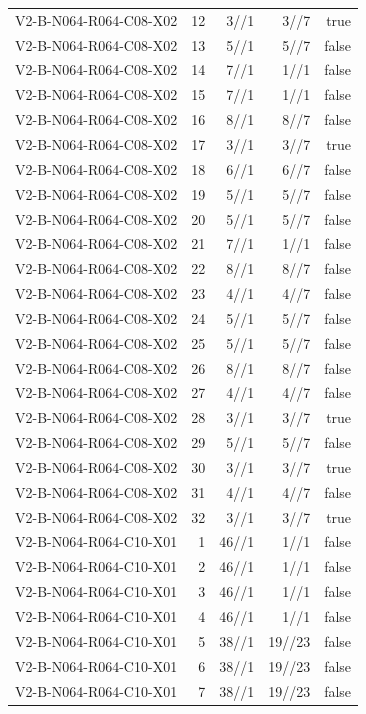 {\begin{longtable}{lrrrr}
V2-B-N064-R064-C08-X02 & 12 & 3//1 & 3//7 & true \\
V2-B-N064-R064-C08-X02 & 13 & 5//1 & 5//7 & false \\
V2-B-N064-R064-C08-X02 & 14 & 7//1 & 1//1 & false \\
V2-B-N064-R064-C08-X02 & 15 & 7//1 & 1//1 & false \\
V2-B-N064-R064-C08-X02 & 16 & 8//1 & 8//7 & false \\
V2-B-N064-R064-C08-X02 & 17 & 3//1 & 3//7 & true \\
V2-B-N064-R064-C08-X02 & 18 & 6//1 & 6//7 & false \\
V2-B-N064-R064-C08-X02 & 19 & 5//1 & 5//7 & false \\
V2-B-N064-R064-C08-X02 & 20 & 5//1 & 5//7 & false \\
V2-B-N064-R064-C08-X02 & 21 & 7//1 & 1//1 & false \\
V2-B-N064-R064-C08-X02 & 22 & 8//1 & 8//7 & false \\
V2-B-N064-R064-C08-X02 & 23 & 4//1 & 4//7 & false \\
V2-B-N064-R064-C08-X02 & 24 & 5//1 & 5//7 & false \\
V2-B-N064-R064-C08-X02 & 25 & 5//1 & 5//7 & false \\
V2-B-N064-R064-C08-X02 & 26 & 8//1 & 8//7 & false \\
V2-B-N064-R064-C08-X02 & 27 & 4//1 & 4//7 & false \\
V2-B-N064-R064-C08-X02 & 28 & 3//1 & 3//7 & true \\
V2-B-N064-R064-C08-X02 & 29 & 5//1 & 5//7 & false \\
V2-B-N064-R064-C08-X02 & 30 & 3//1 & 3//7 & true \\
V2-B-N064-R064-C08-X02 & 31 & 4//1 & 4//7 & false \\
V2-B-N064-R064-C08-X02 & 32 & 3//1 & 3//7 & true \\
V2-B-N064-R064-C10-X01 & 1 & 46//1 & 1//1 & false \\
V2-B-N064-R064-C10-X01 & 2 & 46//1 & 1//1 & false \\
V2-B-N064-R064-C10-X01 & 3 & 46//1 & 1//1 & false \\
V2-B-N064-R064-C10-X01 & 4 & 46//1 & 1//1 & false \\
V2-B-N064-R064-C10-X01 & 5 & 38//1 & 19//23 & false \\
V2-B-N064-R064-C10-X01 & 6 & 38//1 & 19//23 & false \\
V2-B-N064-R064-C10-X01 & 7 & 38//1 & 19//23 & false \\

\end{longtable}}
